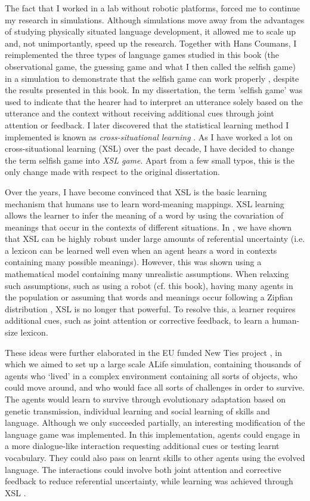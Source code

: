 The fact that I worked in a lab without robotic platforms, forced me to continue my research in simulations. Although simulations move away from the advantages of studying physically situated language development, it allowed me to scale up and, not unimportantly, speed up the research. 
Together with Hans Coumans, I reimplemented the three types of language games studied in this book (the observational game, the guessing game and what I then called the selfish game) in a simulation to demonstrate that the selfish game can work properly \citep{vogtcoumans:2003}, despite the results presented in this book. In my dissertation, the term 'selfish game' was used to indicate that the hearer had to interpret an utterance solely based on the utterance and the context without receiving additional cues through joint attention or feedback. I later discovered that the statistical learning method I implemented is known as {\em cross-situational learning} \citep{pinker:1989,siskind:1996}. As I have worked a lot on cross-situational learning (XSL) over the past decade, I have decided to change the term selfish game into {\em XSL game}. Apart from a few small typos, this is the only change made with respect to the original dissertation.

Over the years, I have become convinced that XSL is the basic learning mechanism that humans use to learn word-meaning mappings. XSL learning allows the learner to infer the meaning of a word by using the covariation of meanings that occur in the contexts of different situations. In \citet{smithetal:2006}, we have shown that XSL can be highly robust under large amounts of referential uncertainty (i.e. a lexicon can be learned well even when an agent hears a word in contexts containing many possible meanings). However, this was shown using a mathematical model containing many unrealistic assumptions. When relaxing such assumptions, such as using a robot (cf. this book), having many agents in the population \citep{vogtcoumans:2003} or assuming that words and meanings occur following a Zipfian distribution \citep{vogt:2012}, XSL is no longer that powerful. To resolve this, a learner requires additional cues, such as joint attention or corrective feedback, to learn a human-size lexicon. 

These ideas were further elaborated in the EU funded New Ties project \citep{gilbertetal:2006}, in which we aimed to set up a large scale ALife simulation, containing thousands of agents who ‘lived' in a complex environment containing all sorts of objects, who could move around, and who would face all sorts of challenges in order to survive. The agents would learn to survive through evolutionary adaptation based on genetic transmission, individual learning and social learning of skills and language. Although we only succeeded partially, an interesting modification of the language game was implemented. In this implementation, agents could engage in a more dialogue-like interaction requesting additional cues or testing learnt vocabulary. They could also pass on learnt skills to other agents using the evolved language. The interactions could involve both joint attention and corrective feedback to reduce referential uncertainty, while learning was achieved through XSL \citep{vogtdivina:2007,vogthaasdijk:2010}.

